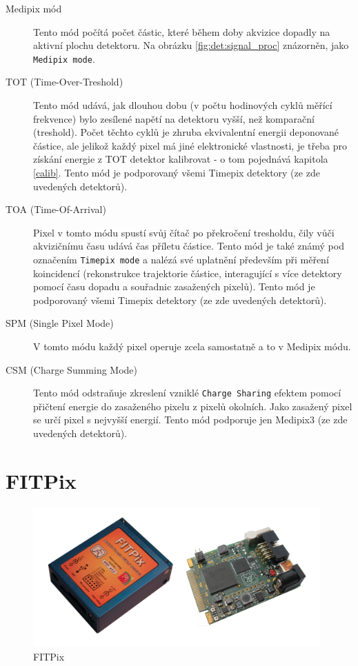 \begin{description}
	\item[Medipix mód] Tento mód počítá počet částic, které během doby akvizice dopadly na aktivní plochu detektoru. Na obrázku \ref{fig:det:signal_proc} znázorněn, jako \texttt{Medipix mode}.
	\item[TOT (Time-Over-Treshold)] Tento mód udává, jak dlouhou dobu (v počtu hodinových cyklů měřící frekvence) bylo zesílené napětí na detektoru vyšší, než komparační (treshold). Počet těchto cyklů je zhruba ekvivalentní energii deponované částice, ale jelikož každý pixel má jiné elektronické vlastnosti, je třeba pro získání energie z TOT detektor kalibrovat - o tom pojednává kapitola \ref{calib}. Tento mód je podporovaný všemi Timepix detektory (ze zde uvedených detektorů).
	\item[TOA (Time-Of-Arrival)] Pixel v tomto módu spustí svůj čítač po překročení tresholdu, čily vůči akvizičnímu času udává čas příletu částice. Tento mód je také známý pod označením \texttt{Timepix mode} a nalézá své uplatnění především při měření koincidencí (rekonstrukce trajektorie částice, interagující s více detektory pomocí času dopadu a souřadnic zasažených pixelů). Tento mód je podporovaný všemi Timepix detektory (ze zde uvedených detektorů).
	\item[SPM (Single Pixel Mode)] V tomto módu každý pixel operuje zcela samostatně a to v Medipix módu.
	\item[CSM (Charge Summing Mode)]\label{det:mod:csm} Tento mód odstraňuje zkreslení vzniklé \texttt{Charge Sharing} efektem pomocí přičtení energie do zasaženého pixelu z pixelů okolních. Jako zasažený pixel se určí pixel s nejvyšší energií. Tento mód podporuje jen Medipix3 (ze zde uvedených detektorů).

\end{description}

\section{FITPix}\label{det:fitpix}

\begin{figure}[th!]
	\begin{center}
		\includegraphics[width=11cm]{figures/fitpix.png}
		\caption{FITPix}
		\label{fig:det:fitpix}
	\end{center}
\end{figure}

